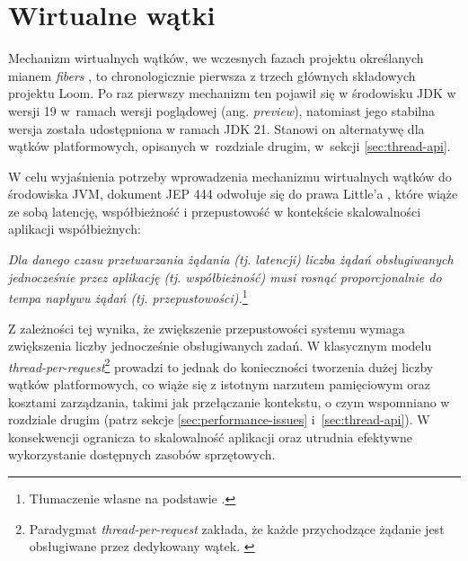 \section{Wirtualne wątki}
\label{sec:virtual-threads}


Mechanizm wirtualnych wątków, we wczesnych fazach projektu określanych mianem \emph{fibers} \cite{openjdk-loom-proposal}, to chronologicznie pierwsza z trzech głównych składowych projektu Loom. Po raz pierwszy mechanizm ten pojawił się w środowisku JDK w wersji 19 w~ramach wersji poglądowej (ang. \emph{preview}), natomiast jego stabilna wersja została udostępniona w ramach JDK 21. Stanowi on alternatywę dla wątków platformowych, opisanych w~rozdziale drugim, w~sekcji \ref{sec:thread-api}.

W celu wyjaśnienia potrzeby wprowadzenia mechanizmu wirtualnych wątków do środowiska JVM, dokument JEP 444 \cite{jep444} odwołuje się do prawa Little'a \cite{little2015}, które wiąże ze sobą latencję, współbieżność i przepustowość w kontekście skalowalności aplikacji współbieżnych:

\begin{displayquote}
    \textit{Dla danego czasu przetwarzania żądania (tj. latencji) liczba żądań obsługiwanych jednocześnie przez aplikację (tj. współbieżność) musi rosnąć proporcjonalnie do tempa napływu żądań (tj. przepustowości).}\footnote{Tłumaczenie własne na podstawie \cite{jep444}.}
\end{displayquote}
Z zależności tej wynika, że zwiększenie przepustowości systemu wymaga zwiększenia liczby jednocześnie obsługiwanych zadań. W klasycznym modelu \emph{thread-per-request}\footnote{Paradygmat \emph{thread-per-request} zakłada, że każde przychodzące żądanie jest obsługiwane przez dedykowany wątek. \cite{goetz2006}} prowadzi to jednak do konieczności tworzenia dużej liczby wątków platformowych, co wiąże się z istotnym narzutem pamięciowym oraz kosztami zarządzania, takimi jak przełączanie kontekstu, o czym wspomniano w rozdziale drugim (patrz sekcje \ref{sec:performance-issues} i~\ref{sec:thread-api}). W konsekwencji ogranicza to skalowalność aplikacji oraz utrudnia efektywne wykorzystanie dostępnych zasobów sprzętowych.

